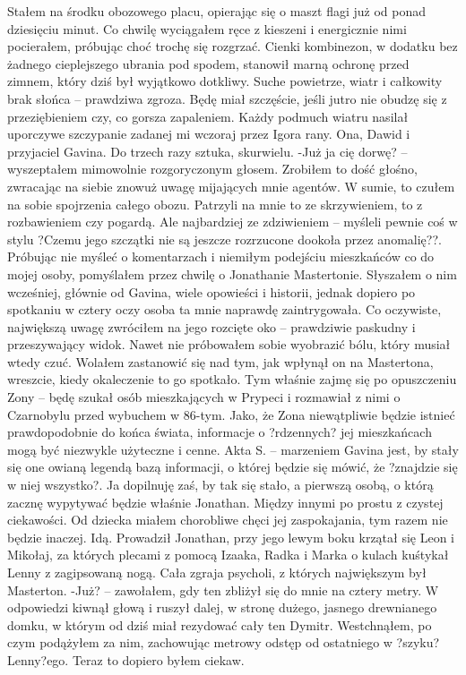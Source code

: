 \documentclass[../MAIN.tex]{subfiles}
\begin{document}
Stałem na środku obozowego placu, opierając się o maszt flagi już od ponad dziesięciu minut. Co chwilę wyciągałem ręce z kieszeni i energicznie nimi pocierałem, próbując choć trochę się rozgrzać. Cienki kombinezon, w dodatku bez żadnego cieplejszego ubrania pod spodem, stanowił marną ochronę przed zimnem, który dziś był wyjątkowo dotkliwy. Suche powietrze, wiatr i całkowity brak słońca -- prawdziwa zgroza. Będę miał szczęście, jeśli jutro nie obudzę się z przeziębieniem czy, co gorsza zapaleniem.
Każdy podmuch wiatru nasilał uporczywe szczypanie zadanej mi wczoraj przez Igora rany. Ona, Dawid i przyjaciel Gavina. Do trzech razy sztuka, skurwielu.
-Już ja cię dorwę? -- wyszeptałem mimowolnie rozgoryczonym głosem. Zrobiłem to dość głośno, zwracając na siebie znowuż uwagę mijających mnie agentów. W sumie, to czułem na sobie spojrzenia całego obozu. Patrzyli na mnie to ze skrzywieniem, to z rozbawieniem czy pogardą. Ale najbardziej ze zdziwieniem -- myśleli pewnie coś w stylu ?Czemu jego szczątki nie są jeszcze rozrzucone dookoła przez anomalię??.
Próbując nie myśleć o komentarzach i niemiłym podejściu mieszkańców co do mojej osoby, pomyślałem przez chwilę o Jonathanie Mastertonie.
Słyszałem o nim wcześniej, głównie od Gavina, wiele opowieści i historii, jednak dopiero po spotkaniu w cztery oczy osoba ta mnie naprawdę zaintrygowała. Co oczywiste, największą uwagę zwróciłem na jego rozcięte oko -- prawdziwie paskudny i przeszywający widok. Nawet nie próbowałem sobie wyobrazić bólu, który musiał wtedy czuć. Wolałem zastanowić się nad tym, jak wpłynął on na Mastertona, wreszcie, kiedy okaleczenie to go spotkało.
Tym właśnie zajmę się po opuszczeniu Zony -- będę szukał osób mieszkających w Prypeci i rozmawiał z nimi o Czarnobylu przed wybuchem w 86-tym. Jako, że Zona niewątpliwie będzie istnieć prawdopodobnie do końca świata, informacje o ?rdzennych? jej mieszkańcach mogą być niezwykle użyteczne i cenne. Akta S. -- marzeniem Gavina jest, by stały się one owianą legendą bazą informacji, o której będzie się mówić, że ?znajdzie się w niej wszystko?. Ja dopilnuję zaś, by tak się stało, a pierwszą osobą, o którą zacznę wypytywać będzie właśnie Jonathan.
Między innymi po prostu z czystej ciekawości. Od dziecka miałem chorobliwe chęci jej zaspokajania, tym razem nie będzie inaczej.
Idą.
Prowadził Jonathan, przy jego lewym boku krzątał się Leon i Mikołaj, za których plecami z pomocą Izaaka, Radka i Marka o kulach kuśtykał Lenny z zagipsowaną nogą.
Cała zgraja psycholi, z których największym był Masterton.
-Już? -- zawołałem, gdy ten zbliżył się do mnie na cztery metry. W odpowiedzi kiwnął głową i ruszył dalej, w stronę dużego, jasnego drewnianego domku, w którym od dziś miał rezydować cały ten Dymitr.
Westchnąłem, po czym podążyłem za nim, zachowując metrowy odstęp od ostatniego w ?szyku? Lenny?ego.
Teraz to dopiero byłem ciekaw.
\end{document}
